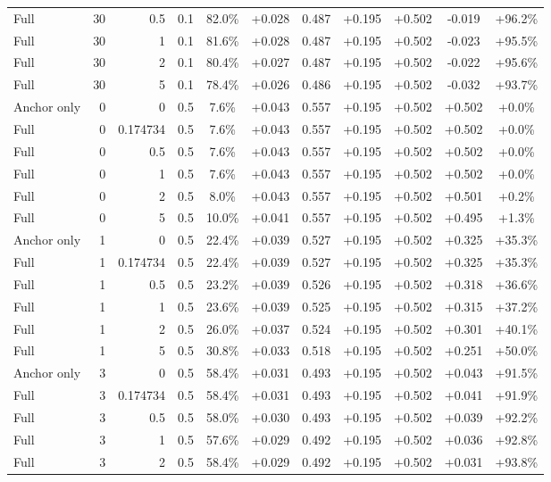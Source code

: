 \begin{table}[htbp]
\begin{tabular}{lrrrccccccc}
Full & 30 & 0.5 & 0.1 & 82.0\% & +0.028 & 0.487 & +0.195 & +0.502 & -0.019 & +96.2\% \\
Full & 30 & 1 & 0.1 & 81.6\% & +0.028 & 0.487 & +0.195 & +0.502 & -0.023 & +95.5\% \\
Full & 30 & 2 & 0.1 & 80.4\% & +0.027 & 0.487 & +0.195 & +0.502 & -0.022 & +95.6\% \\
Full & 30 & 5 & 0.1 & 78.4\% & +0.026 & 0.486 & +0.195 & +0.502 & -0.032 & +93.7\% \\
Anchor only & 0 & 0 & 0.5 & 7.6\% & +0.043 & 0.557 & +0.195 & +0.502 & +0.502 & +0.0\% \\
Full & 0 & 0.174734 & 0.5 & 7.6\% & +0.043 & 0.557 & +0.195 & +0.502 & +0.502 & +0.0\% \\
Full & 0 & 0.5 & 0.5 & 7.6\% & +0.043 & 0.557 & +0.195 & +0.502 & +0.502 & +0.0\% \\
Full & 0 & 1 & 0.5 & 7.6\% & +0.043 & 0.557 & +0.195 & +0.502 & +0.502 & +0.0\% \\
Full & 0 & 2 & 0.5 & 8.0\% & +0.043 & 0.557 & +0.195 & +0.502 & +0.501 & +0.2\% \\
Full & 0 & 5 & 0.5 & 10.0\% & +0.041 & 0.557 & +0.195 & +0.502 & +0.495 & +1.3\% \\
Anchor only & 1 & 0 & 0.5 & 22.4\% & +0.039 & 0.527 & +0.195 & +0.502 & +0.325 & +35.3\% \\
Full & 1 & 0.174734 & 0.5 & 22.4\% & +0.039 & 0.527 & +0.195 & +0.502 & +0.325 & +35.3\% \\
Full & 1 & 0.5 & 0.5 & 23.2\% & +0.039 & 0.526 & +0.195 & +0.502 & +0.318 & +36.6\% \\
Full & 1 & 1 & 0.5 & 23.6\% & +0.039 & 0.525 & +0.195 & +0.502 & +0.315 & +37.2\% \\
Full & 1 & 2 & 0.5 & 26.0\% & +0.037 & 0.524 & +0.195 & +0.502 & +0.301 & +40.1\% \\
Full & 1 & 5 & 0.5 & 30.8\% & +0.033 & 0.518 & +0.195 & +0.502 & +0.251 & +50.0\% \\
Anchor only & 3 & 0 & 0.5 & 58.4\% & +0.031 & 0.493 & +0.195 & +0.502 & +0.043 & +91.5\% \\
Full & 3 & 0.174734 & 0.5 & 58.4\% & +0.031 & 0.493 & +0.195 & +0.502 & +0.041 & +91.9\% \\
Full & 3 & 0.5 & 0.5 & 58.0\% & +0.030 & 0.493 & +0.195 & +0.502 & +0.039 & +92.2\% \\
Full & 3 & 1 & 0.5 & 57.6\% & +0.029 & 0.492 & +0.195 & +0.502 & +0.036 & +92.8\% \\
Full & 3 & 2 & 0.5 & 58.4\% & +0.029 & 0.492 & +0.195 & +0.502 & +0.031 & +93.8\% \\

\end{tabular}
\end{table}

